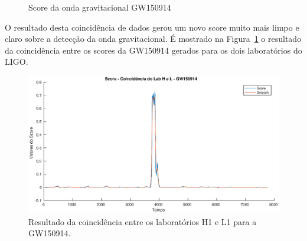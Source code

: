  \begin{figure}
     \caption{Score da onda gravitacional GW150914}
 \end{figure}

O resultado desta coincidência de dados gerou um novo score muito mais limpo e claro sobre a detecção da onda gravitacional. É mostrado na Figura~\ref{fig:scoreHL} o resultado da coincidência entre os scores da GW150914 gerados para os dois laboratórios do LIGO.

\begin{figure}[H]
\centering
\includegraphics[width=1\textwidth]{figuras/GW150914_LabHL.eps}
\caption{Resultado da coincidência entre os laboratórios H1 e L1 para a GW150914.}
\label{fig:scoreHL}
\end{figure}

